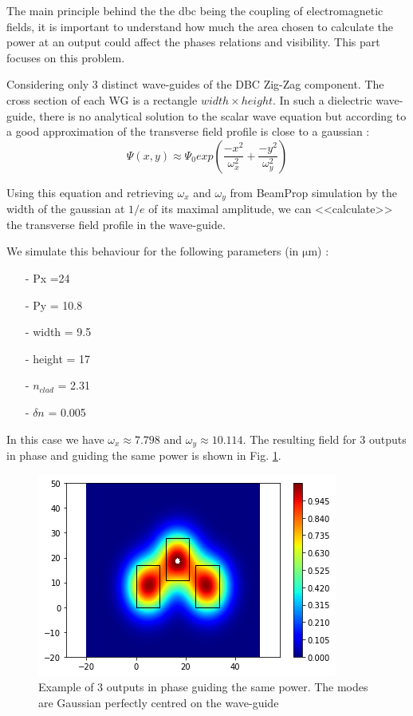 
The main principle behind the the \gls{dbc} being the coupling of electromagnetic fields, it is important to understand how much the area chosen to calculate the power at an output could affect the phases relations and visibility. This part focuses on this problem.

Considering  only 3 distinct wave-guides of the DBC Zig-Zag component. The cross section of each WG is a rectangle $width \times height$. In such a dielectric wave-guide, there is no analytical solution to the scalar wave equation but according to \cite{labeye} a good approximation of the transverse field profile is close to a gaussian :
$$
\Psi(x,y) \approx \Psi_0 exp\left( \frac{-x^2}{\omega_x^2} + \frac{-y^2}{\omega_y^2}\right)
$$

Using this equation and retrieving $\omega_x$ and $\omega_y$ from BeamProp simulation by the width of the gaussian at $1/e$ of its maximal amplitude, we can <<calculate>> the transverse field profile in the wave-guide.

We simulate this behaviour for the following parameters (in $\si{\micro\meter}$) :
\begin{itemize}
    \setlength\itemsep{0pt}
\item[-] Px =24
\item[-] Py = 10.8
\item[-] width = 9.5
\item[-] height = 17
\item[-] $n_{clad}$ = 2.31
\item[-] $\delta n$ = 0.005
\end{itemize}
In this case we have $\omega_x \approx 7.798$ and $\omega_y \approx
10.114$. The resulting field for 3 outputs in phase and guiding the same
power is shown in Fig. \ref{fig:3gauss}.

\begin{figure}[htbp]
  \centering
  \includegraphics[scale=.5]{picture/integrating_area/3gauss.png}
  \caption{Example of 3 outputs in phase guiding the same power. The modes are Gaussian perfectly centred on the wave-guide}
  \label{fig:3gauss}
\end{figure}

